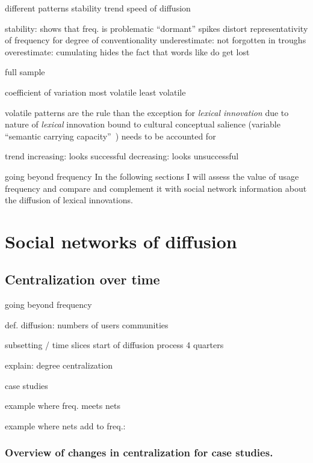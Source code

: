 \documentclass[a4paper, abstract=on]{scrartcl}
\begin{document}
    different patterns
      stability
      trend
      speed of diffusion

    stability: shows that freq. is problematic
      \enquote{dormant}
        spikes distort representativity of frequency for degree of conventionality
          underestimate:  not forgotten in troughs
          overestimate: cumulating hides the fact that words like  do get lost

    full sample

      coefficient of variation
        most volatile
        least volatile

      volatile patterns are the rule than the exception for \emph{lexical innovation}
        due to nature of \emph{lexical} innovation
          bound to cultural conceptual salience (variable \enquote{semantic carrying capacity}~\parencite{Nini2017})
        needs to be accounted for

        trend
          increasing: looks successful
          decreasing: looks unsuccessful

    going beyond frequency
      In the following sections I will assess the value of usage frequency and compare and complement it with social network information about the diffusion of lexical innovations.

\section{Social networks of diffusion}

  \subsection{Centralization over time}

    going beyond frequency

    def. diffusion:
      numbers of users
      communities

    subsetting / time slices
      start of diffusion process
      4 quarters

    explain: degree centralization

    case studies

      example where freq. meets nets

      example where nets add to freq.: 

    \subsubsection{Overview of changes in centralization for case studies.}
\end{document}
